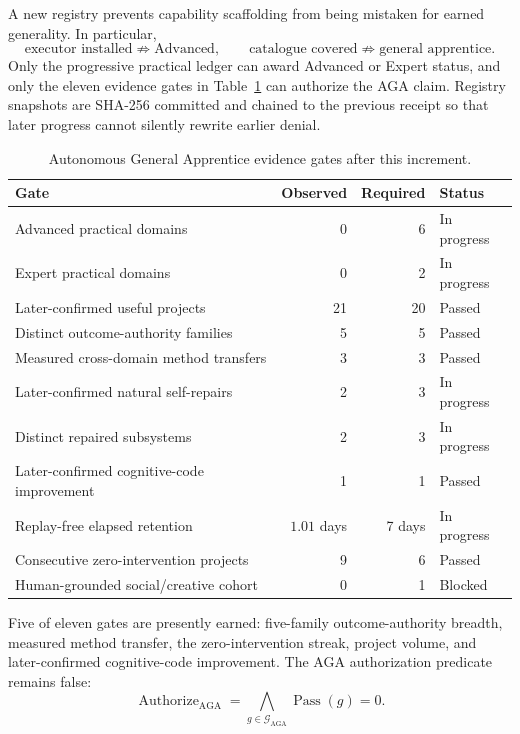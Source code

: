 A new registry prevents capability scaffolding from being mistaken for earned
generality.  In particular,
\begin{equation}
\text{executor installed}\not\Rightarrow\text{Advanced},\qquad
\text{catalogue covered}\not\Rightarrow\text{general apprentice}.
\label{eq:aion-aga-nonimplication}
\end{equation}
Only the progressive practical ledger can award Advanced or Expert status, and
only the eleven evidence gates in Table~\ref{tab:aion-aga-gates} can authorize
the AGA claim.  Registry snapshots are SHA-256 committed and chained to the
previous receipt so that later progress cannot silently rewrite earlier denial.

\begin{table}[htbp]
\centering
\caption{Autonomous General Apprentice evidence gates after this increment.}
\label{tab:aion-aga-gates}
\begin{tabularx}{\textwidth}{@{}>{\raggedright\arraybackslash}Xrrl@{}}
\toprule
Gate & Observed & Required & Status \\
\midrule
Advanced practical domains & 0 & 6 & In progress \\
Expert practical domains & 0 & 2 & In progress \\
Later-confirmed useful projects & 21 & 20 & Passed \\
Distinct outcome-authority families & 5 & 5 & Passed \\
Measured cross-domain method transfers & 3 & 3 & Passed \\
Later-confirmed natural self-repairs & 2 & 3 & In progress \\
Distinct repaired subsystems & 2 & 3 & In progress \\
Later-confirmed cognitive-code improvement & 1 & 1 & Passed \\
Replay-free elapsed retention & $1.01$ days & 7 days & In progress \\
Consecutive zero-intervention projects & 9 & 6 & Passed \\
Human-grounded social/creative cohort & 0 & 1 & Blocked \\
\bottomrule
\end{tabularx}
\end{table}

Five of eleven gates are presently earned: five-family outcome-authority
breadth, measured method transfer, the zero-intervention streak, project volume,
and later-confirmed cognitive-code improvement.  The AGA
authorization predicate remains false:
\begin{equation}
\operatorname{Authorize}_{\mathrm{AGA}}
=\bigwedge_{g\in\mathcal{G}_{\mathrm{AGA}}}\operatorname{Pass}(g)
=0.
\label{eq:aion-aga-authorization-false}
\end{equation}

